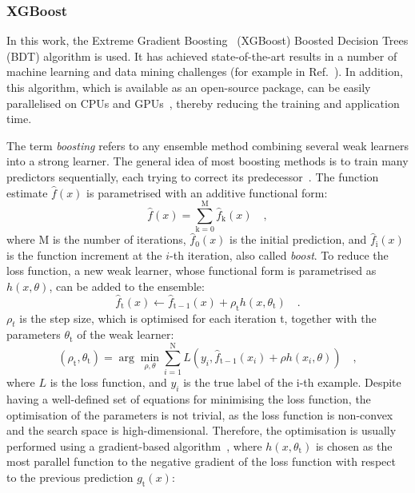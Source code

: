 \subsubsection{XGBoost}
In this work, the Extreme Gradient Boosting~\cite{DBLP:xgboost} (XGBoost) Boosted Decision Trees (BDT) algorithm is used. It has achieved state-of-the-art results in a number of machine learning and data mining challenges (for example in Ref.~\cite{kaggle:higgs}). In addition, this algorithm, which is available as an open-source package, can be easily parallelised on CPUs and GPUs~\cite{mitchell2017accelerating}, thereby reducing the training and application time.

The term \emph{boosting} refers to any ensemble method combining several weak learners into a strong learner. The general idea of most boosting methods is to train many predictors sequentially, each trying to correct its predecessor~\cite{geron2022hands}. The function estimate $\widehat{f}(x)$ is parametrised with an additive functional form:
\begin{equation*}
    \widehat{f}(x) = \sum_{\mathrm{k}=0}^{\mathrm{M}} \widehat{f}_\mathrm{k}(x)\quad ,
\end{equation*}
where M is the number of iterations, $\widehat{f}_\mathrm{0}(x)$ is the initial prediction, and $\widehat{f}_\mathrm{i}(x)$ is the function increment at the $i$-th iteration, also called \emph{boost}. To reduce the loss function, a new weak learner, whose functional form is parametrised as $h(x,\theta)$, can be added to the ensemble:
\begin{equation*}
    \widehat{f}_\mathrm{t}(x) \leftarrow \widehat{f}_{\mathrm{t}-1}(x) + \rho_\mathrm{t} h(x,\theta_\mathrm{t})\quad .
\end{equation*}
$\rho_t$ is the step size, which is optimised for each iteration t, together with the parameters $\theta_\mathrm{t}$ of the weak learner:
\begin{equation*}
    (\rho_\mathrm{t}, \theta_\mathrm{t}) = \arg\min_{\rho,\theta} \sum_{{i}=1}^{\mathrm{N}} L\left(y_i, \widehat{f}_{\mathrm{t}-1}(x_i) + \rho h(x_i,\theta)\right)\quad ,
\end{equation*}
where $L$ is the loss function, and $y_i$ is the true label of the i-th example. Despite having a well-defined set of equations for minimising the loss function, the optimisation of the parameters is not trivial, as the loss function is non-convex and the search space is high-dimensional. Therefore, the optimisation is usually performed using a gradient-based algorithm~\cite{friedman2001greedy,natekin2013gradient}, where $h(x,\theta_\mathrm{t})$ is chosen as the most parallel function to the negative gradient of the loss function with respect to the previous prediction $g_\mathrm{t}(x)$:
